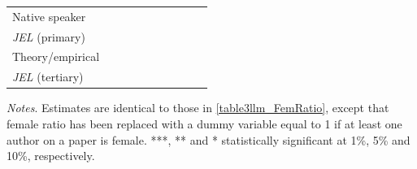 \begin{table}
\begin{threeparttable}
\begin{tabular}{p{3cm}S@{}S@{}S@{}S@{}S@{}S@{}S@{}S@{}S@{}}
            Native speaker                &               &               &               &               &           {}   &           {}   &           {}   &           {}   &           {}   \\
            \textit{JEL} (primary)        &               &               &               &               &               &               &           {}   &               &               \\
            Theory/empirical              &               &               &               &               &               &               &               &           {}   &               \\
            \textit{JEL} (tertiary)       &               &               &               &               &               &               &               &               &           {}   \\
            \bottomrule
        \end{tabular}
        \begin{tablenotes}
            \tiny
            \item \textit{Notes}. Estimates are identical to those in \autoref{table3llm_FemRatio}, except that female ratio has been replaced with a dummy variable equal to 1 if at least one author on a paper is female. ***, ** and * statistically significant at 1\%, 5\% and 10\%, respectively.
        \end{tablenotes}
    \end{threeparttable}

\end{table}
